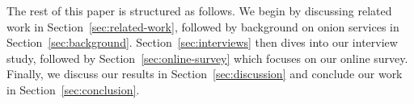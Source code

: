 The rest of this paper is structured as follows.  We begin by discussing related
work in Section~\ref{sec:related-work}, followed by background on onion services
in Section~\ref{sec:background}.  Section~\ref{sec:interviews} then dives into
our interview study, followed by Section~\ref{sec:online-survey} which focuses
on our online survey.  Finally, we discuss our results in
Section~\ref{sec:discussion} and conclude our work in
Section~\ref{sec:conclusion}.
